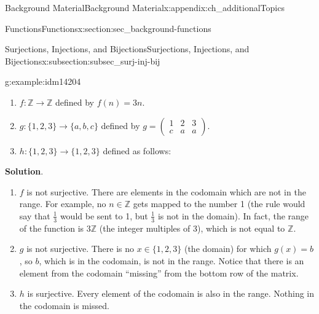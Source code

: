 \documentclass[oneside,10pt,]{book}
\numberwithin{equation}{chapter}
\def\Z{\mathbb Z}
\newcommand{\amp}{&}
\begin{document}
\begin{appendixptx}{Background Material}{}{Background Material}{}{}{x:appendix:ch_additionalTopics}
\begin{sectionptx}{Functions}{}{Functions}{}{}{x:section:sec_background-functions}
\begin{subsectionptx}{Surjections, Injections, and Bijections}{}{Surjections, Injections, and Bijections}{}{}{x:subsection:subsec_surj-inj-bij}
\begin{example}{}{g:example:idm14204}
\par
%
\begin{enumerate}
\item{}\(f:\Z \to \Z\) defined by \(f(n) = 3n\).%
\item{}\(g: \{1,2,3\} \to \{a,b,c\}\) defined by \(g = \begin{pmatrix}1 \amp 2 \amp 3 \\ c \amp a \amp a \end{pmatrix}\).%
\item{}\(h:\{1,2,3\} \to \{1,2,3\}\) defined as follows:%
\begin{sidebyside}{1}{0.4}{0.4}{0}%
\begin{sbspanel}{0.2}%
%
\end{sbspanel}%
\end{sidebyside}%
\end{enumerate}
%
\par\smallskip%
\noindent\textbf{Solution}.\hypertarget{g:solution:idm14221}{}\quad{}%
\begin{enumerate}
\item{}\(f\) is not surjective. There are elements in the codomain which are not in the range. For example, no \(n \in \Z\) gets mapped to the number 1 (the rule would say that \(\frac{1}{3}\) would be sent to 1, but \(\frac{1}{3}\) is not in the domain). In fact, the range of the function is \(3\Z\) (the integer multiples of 3), which is not equal to \(\Z\).%
\item{}\(g\) is not surjective. There is no \(x \in \{1,2,3\}\) (the domain) for which \(g(x) = b\), so \(b\), which is in the codomain, is not in the range. Notice that there is an element from the codomain ``missing'' from the bottom row of the matrix.%
\item{}\(h\) is surjective. Every element of the codomain is also in the range. Nothing in the codomain is missed.%
\end{enumerate}
%
\end{example}

\end{subsectionptx}
\end{sectionptx}
\end{appendixptx}
\end{document}
